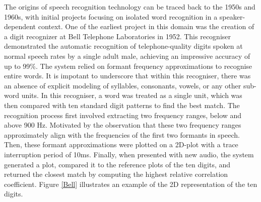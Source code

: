 The origins of speech recognition technology can be traced back to the 1950s and 1960s, with initial projects focusing on isolated word recognition in a speaker-dependent context. One of the earliest project in this domain was the creation of a digit recognizer at Bell Telephone Laboratories in 1952. This recogniser demonstrated the automatic recognition of telephone-quality digits spoken at normal speech rates by a single adult male, achieving an impressive accuracy of up to 99\%. The system relied on formant frequency approximations to recognise entire words. It is impotant to underscore that within this recogniser, there was an absence of explicit modeling of syllables, consonants, vowels, or any other sub-word units. In this recogniser, a word was treated as a single unit, which was then compared with ten standard digit patterns to find the best match. The recognition process first involved extracting two frequency ranges, below and above 900 Hz. Motivated by the observation that these two frequency ranges approximately align with the frequencies of the first two formants in speech. Then, these formant approximations were plotted on a 2D-plot with a trace interruption period of 10ms. Finally, when presented with new audio, the system generated a plot, compared it to the reference plots of the ten digits, and returned the closest match by computing the highest relative correlation coefficient. Figure \ref{Bell} illustrates an example of the 2D representation of the ten digits.


